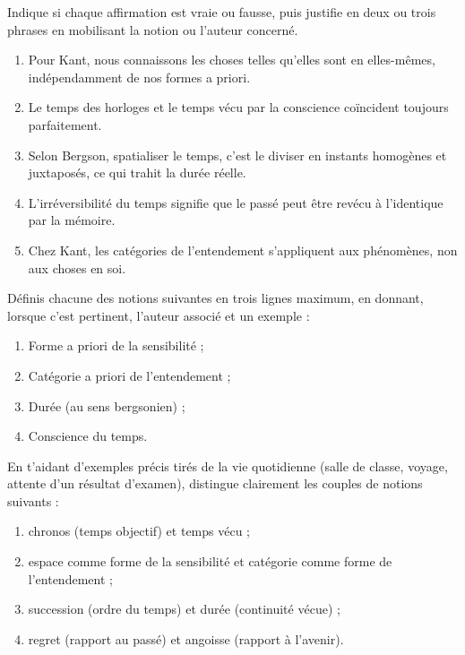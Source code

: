 \documentclass[11pt]{article}
\newcommand{\cle}[1]{{\popxbold\color{popdark}#1}}
\begin{document}
\begin{exercice}
Indique si chaque affirmation est vraie ou fausse, puis justifie en deux ou trois phrases en mobilisant la notion ou l'auteur concerné.

\begin{enumerate}
\item Pour Kant, nous connaissons les choses telles qu'elles sont en elles-mêmes, indépendamment de nos formes a priori.
\item Le temps des horloges et le temps vécu par la conscience coïncident toujours parfaitement.
\item Selon Bergson, spatialiser le temps, c'est le diviser en instants homogènes et juxtaposés, ce qui trahit la durée réelle.
\item L'irréversibilité du temps signifie que le passé peut être revécu à l'identique par la mémoire.
\item Chez Kant, les catégories de l'entendement s'appliquent aux phénomènes, non aux choses en soi.
\end{enumerate}
\end{exercice}

\begin{exercice}
Définis chacune des notions suivantes en trois lignes maximum, en donnant, lorsque c'est pertinent, l'auteur associé et un exemple :
\begin{enumerate}
\item \cle{Forme a priori de la sensibilité} ;
\item \cle{Catégorie a priori de l'entendement} ;
\item \cle{Durée} (au sens bergsonien) ;
\item \cle{Conscience du temps}.
\end{enumerate}
\end{exercice}

\begin{exercice}
En t'aidant d'exemples précis tirés de la vie quotidienne (salle de classe, voyage, attente d'un résultat d'examen), distingue clairement les couples de notions suivants :
\begin{enumerate}
\item \cle{chronos} (temps objectif) et \cle{temps vécu} ;
\item \cle{espace} comme forme de la sensibilité et \cle{catégorie} comme forme de l'entendement ;
\item \cle{succession} (ordre du temps) et \cle{durée} (continuité vécue) ;
\item \cle{regret} (rapport au passé) et \cle{angoisse} (rapport à l'avenir).
\end{enumerate}
\end{exercice}
\end{document}
